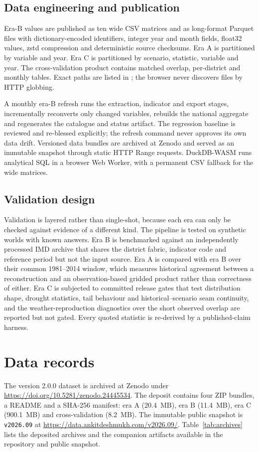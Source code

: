 \documentclass[10pt,a4paper]{article}
\begin{document}
\subsection*{Data engineering and publication}
Era-B values are published as ten wide CSV matrices and as long-format Parquet files with dictionary-encoded identifiers, integer year and month fields, float32 values, zstd compression and deterministic source checksums. Era A is partitioned by variable and year. Era C is partitioned by scenario, statistic, variable and year. The cross-validation product contains matched overlap, per-district and monthly tables. Exact paths are listed in ; the browser never discovers files by HTTP globbing.

A monthly era-B refresh runs the extraction, indicator and export stages, incrementally reconverts only changed variables, rebuilds the national aggregate and regenerates the catalogue and status artifact. The regression baseline is reviewed and re-blessed explicitly; the refresh command never approves its own data drift. Versioned data bundles are archived at Zenodo\citep{DeshmukhData2026} and served as an immutable snapshot through static HTTP Range requests. DuckDB-WASM runs analytical SQL in a browser Web Worker, with a permanent CSV fallback for the wide matrices.

\subsection*{Validation design}
Validation is layered rather than single-shot, because each era can only be checked against evidence of a different kind. The pipeline is tested on synthetic worlds with known answers. Era B is benchmarked against an independently processed IMD archive that shares the district fabric, indicator code and reference period but not the input source. Era A is compared with era B over their common 1981--2014 window, which measures historical agreement between a reconstruction and an observation-based gridded product rather than correctness of either. Era C is subjected to committed release gates that test distribution shape, drought statistics, tail behaviour and historical--scenario seam continuity, and the weather-reproduction diagnostics over the short observed overlap are reported but not gated. Every quoted statistic is re-derived by a published-claim harness.

\section*{Data records}
The version 2.0.0 dataset is archived at Zenodo under \url{https://doi.org/10.5281/zenodo.24445534}\citep{DeshmukhData2026}. The deposit contains four ZIP bundles, a README and a SHA-256 manifest: era A (20.4~MB), era B (11.4~MB), era C (900.1~MB) and cross-validation (8.2~MB). The immutable public snapshot is \texttt{v2026.09} at \url{https://data.ankitdeshmukh.com/v2026.09/}. Table~\ref{tab:archives} lists the deposited archives and the companion artifacts available in the repository and public snapshot.
\end{document}
